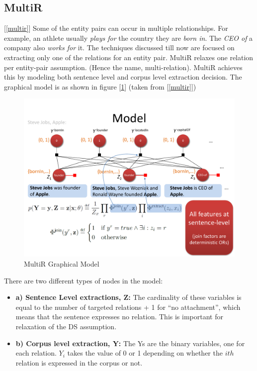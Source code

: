 \documentclass[a4paper,10pt]{article}
\begin{document}
\subsection{MultiR}[\ref{multir}]
Some of the entity pairs can occur in multiple relationships. For example, an athlete usually \emph{plays for} the 
country they are \emph{born in}. The \emph{CEO of} a company also \emph{works for} it. The techniques discussed till now are 
focused on extracting only one of the relations for an entity pair. MultiR relaxes one relation per entity-pair assumption. 
(Hence the name, multi-relation). MultiR achieves this by modeling both sentence level and corpus level extraction decision.
The graphical model is as shown in figure [\ref{fig:multir}] (taken from [\ref{multir}])
\begin{figure}[H]
 \centering
 \includegraphics[bb=0 0 720 540,scale=0.45]{./multirmode1.pdf}
 \caption{MultiR Graphical Model}
 \label{fig:multir}
\end{figure}

There are two different types of nodes in the model:
\begin{itemize}

\item \textbf {a) Sentence Level extractions, Z:}
The cardinality of these variables is equal to the number of targeted relations + 1 for ``no attachment'', which means that 
the sentence expresses no relation. This is important for relaxation of the DS assumption.

\item \textbf{b) Corpus level extraction, Y:}
The Ys are the binary variables, one for each relation. $Y_i$ takes the value of 0 or 1 depending on whether the $ith$ relation is expressed 
in the corpus or not.
\end{itemize}
\end{document}

